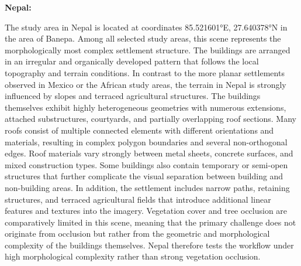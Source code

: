 \textbf{Nepal:}

The study area in Nepal is located at coordinates 85.521601°E, 27.640378°N in the area of Banepa. Among all selected study areas, this scene represents the morphologically most complex settlement structure. The buildings are arranged in an irregular and organically developed pattern that follows the local topography and terrain conditions. In contrast to the more planar settlements observed in Mexico or the African study areas, the terrain in Nepal is strongly influenced by slopes and terraced agricultural structures. The buildings themselves exhibit highly heterogeneous geometries with numerous extensions, attached substructures, courtyards, and partially overlapping roof sections. Many roofs consist of multiple connected elements with different orientations and materials, resulting in complex polygon boundaries and several non-orthogonal edges. Roof materials vary strongly between metal sheets, concrete surfaces, and mixed construction types. Some buildings also contain temporary or semi-open structures that further complicate the visual separation between building and non-building areas. In addition, the settlement includes narrow paths, retaining structures, and terraced agricultural fields that introduce additional linear features and textures into the imagery. Vegetation cover and tree occlusion are comparatively limited in this scene, meaning that the primary challenge does not originate from occlusion but rather from the geometric and morphological complexity of the buildings themselves. Nepal therefore tests the workflow under high morphological complexity rather than strong vegetation occlusion.
